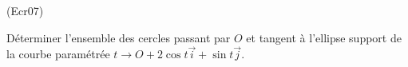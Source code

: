 \begin{tiny}(Ecr07)\end{tiny} Déterminer l'ensemble des cercles passant par $O$ et tangent à l'ellipse support de la courbe paramétrée $t\rightarrow O + 2\cos t \overrightarrow i + \sin t \overrightarrow j$.